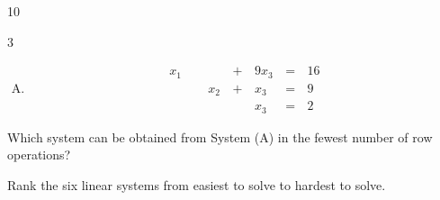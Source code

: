 \begin{applicationActivities}
\begin{activity}{10}
\begin{multicols}{3}
\begin{enumerate}[(A)]
	\item \[
		\begin{alignedat}{4}
	   		x_1 &     &      &\,+\,& 9x_3 &\,=\,& 16 \\
	       		& \,\,\, & x_2 &\,+\,& x_3 &\,=\,& 9 \\
	       		&     &      &\,\,& x_3 &\,=\,& 2 
		\end{alignedat}
	\]
	\end{enumerate}
    \end{multicols}
  \begin{subactivity}
	Which system can be obtained from System (A) in the fewest number of row operations?
  \end{subactivity}
  \begin{subactivity}
    Rank the six linear systems from easiest to solve to hardest to solve.
  \end{subactivity}
\end{activity}


\end{applicationActivities}
